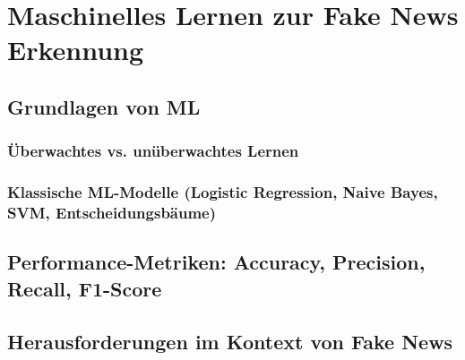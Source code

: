 \chapter{Maschinelles Lernen zur Fake News Erkennung}
\label{chap:maschinelles_lernen_zur_fake_news_erkennung}


\section{Grundlagen von ML}
\label{sec:grundlagen_ml}

\subsection{Überwachtes vs. unüberwachtes Lernen}
\label{subsec:ueberwachtes_vs_unueberwachtes_lernen}

\subsection{Klassische ML-Modelle (Logistic Regression, Naive Bayes, SVM, Entscheidungsbäume)}
\label{subsec:klassische_ml_modelle}


\section{Performance-Metriken: Accuracy, Precision, Recall, F1-Score}
\label{sec:performance_metriken}

\section{Herausforderungen im Kontext von Fake News}
\label{sec:herausforderungen_fake_news}